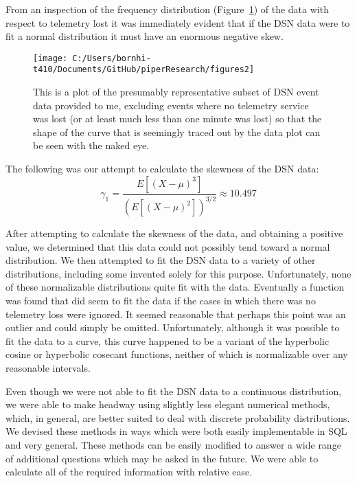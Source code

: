 \documentclass[aps,twocolumn,nobalancelastpage,amsmath,amssymb,
nofootinbib,superscriptaddress, ]{revtex4}
\begin{document}
From an inspection of the frequency distribution (Figure~\ref{fig:freqdist}) of the data with respect to telemetry lost it was immediately evident that if the DSN data were to fit a normal distribution it must have an enormous negative skew.

\begin{figure}[h]
\texttt{[image: C:/Users/bornhi-t410/Documents/GitHub/piperResearch/figures2]}
\caption{This is a plot of the presumably representative subset of DSN event data  provided to me, excluding events where no telemetry service was lost (or at least much less than one minute was lost) so that the shape of the curve that is seemingly traced out by the data plot can be seen with the naked eye.\label{fig:freqdist}}
\end{figure}

The following was our attempt to calculate the skewness of the DSN data:
$$ \gamma_1 = \frac{E[(X - \mu)^3]}{(E[(X - \mu)^2])^{3/2}} \approx 10.497 $$

After attempting to calculate the skewness of the data, and obtaining a positive value, we determined that this data could not possibly tend toward a normal distribution. We then attempted to fit the DSN data to a variety of other distributions, including some invented solely for this purpose. Unfortunately, none of these normalizable distributions quite fit with the data. Eventually a function was found that did seem to fit the data if the cases in which there was no telemetry loss were ignored. It seemed reasonable that perhaps this point was an outlier and could simply be omitted. Unfortunately, although it was possible to fit the data to a curve, this curve happened to be a variant of the hyperbolic cosine or hyperbolic cosecant functions, neither of which is normalizable over any reasonable intervals.

Even though we were not able to fit the DSN data to a continuous distribution, we were able to make headway using slightly less elegant numerical methods, which, in general, are better suited to deal with discrete probability distributions. We devised these methods in ways which were both easily implementable in SQL and very general. These methods can be easily modified to answer a wide range of additional questions which may be asked in the future. We were able to calculate all of the required information with relative ease.
\end{document}
